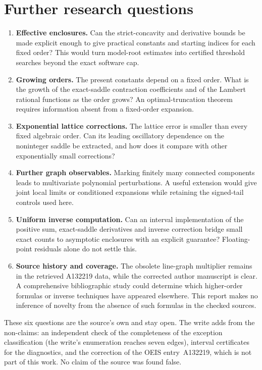 \section{Further research questions}
\begin{enumerate}
\item \textbf{Effective enclosures.} Can the strict-concavity and derivative bounds be made explicit enough to give practical constants and starting indices for each fixed order? This would turn model-root estimates into certified threshold searches beyond the exact software cap.
\item \textbf{Growing orders.} The present constants depend on a fixed order. What is the growth of the exact-saddle contraction coefficients and of the Lambert rational functions as the order grows? An optimal-truncation theorem requires information absent from a fixed-order expansion.
\item \textbf{Exponential lattice corrections.} The lattice error is smaller than every fixed algebraic order. Can its leading oscillatory dependence on the noninteger saddle be extracted, and how does it compare with other exponentially small corrections?
\item \textbf{Further graph observables.} Marking finitely many connected components leads to multivariate polynomial perturbations. A useful extension would give joint local limits or conditioned expansions while retaining the signed-tail controls used here.
\item \textbf{Uniform inverse computation.} Can an interval implementation of the positive sum, exact-saddle derivatives and inverse correction bridge small exact counts to asymptotic enclosures with an explicit guarantee? Floating-point residuals alone do not settle this.
\item \textbf{Source history and coverage.} The obsolete line-graph multiplier remains in the retrieved A132219 data, while the corrected author manuscript is clear. A comprehensive bibliographic study could determine which higher-order formulas or inverse techniques have appeared elsewhere. This report makes no inference of novelty from the absence of such formulas in the checked sources.
\end{enumerate}
\begin{writenote}
These six questions are the source's own and stay open. The write adds from
the non-claims: an independent check of the completeness of the exception
classification (the write's enumeration reaches seven edges), interval
certificates for the diagnostics, and the correction of the OEIS
entry~A132219, which is not part of this work. No claim of the source was
found false.
\end{writenote}
